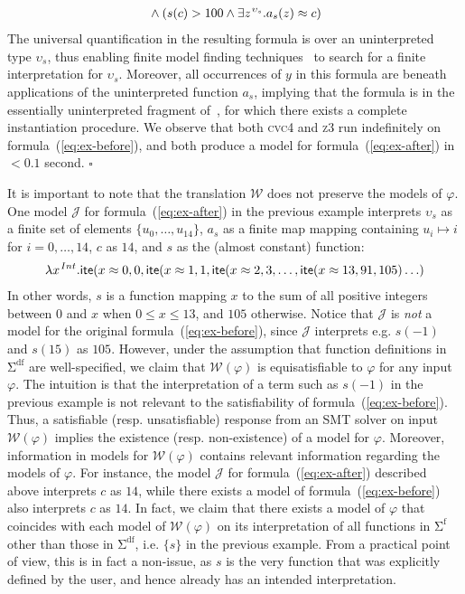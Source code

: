 \documentclass[runningheads,a4paper]{llncs}
\newcommand{\con}[1]{\mathsf{#1}}
\let\oldSigma=\Sigma
\def\Sigma{\mathrm{\oldSigma}}
\newcommand{\cvc}{\textsc{cvc}{\small 4}\xspace}
\newcommand{\ziii}{\textsc{z}{\small 3}\xspace}
\newcommand{\teq}{\approx}
\newcommand{\I}{\mathcal{J}} %
\newcommand{\conv}{\mathcal{W}}
\newcommand{\sfuns}[1]{#1^\mathrm{f}}
\newcommand{\sfundefs}[1]{#1^\mathrm{df}}
\newcommand{\lite}{\con{ite}}
\newcommand{\farg}[1]{a_{#1}}
\newcommand{\fargsort}[1]{\upsilon_{#1}}
\newcommand{\vthinspace}{\kern+0.083333em}
\newcommand{\typ}[1]{^{\vthinspace #1}}
\begin{document}
\begin{example}
\begin{eqnarray}
\begin{split}
\end{split}  
\wedge ( s( c ) > 100 \wedge \exists z\typ{\fargsort{s}}. \farg{s}( z ) \teq c )
\end{eqnarray} 
The universal quantification in the resulting formula is over an uninterpreted type $\fargsort{s}$, 
thus enabling finite model finding techniques~\cite{ReyEtAl-1-RR-13} to search for a finite interpretation for $\fargsort{s}$.
Moreover, all occurrences of $y$ in this formula are beneath applications of the uninterpreted function $\farg{s}$,
implying that the formula is in the essentially uninterpreted fragment of~\cite{GeDeM-CAV-09}, for which there exists a complete instantiation procedure.
We observe that both \cvc and \ziii run indefinitely on formula~(\ref{eq:ex-before}),
and both produce a model for formula~(\ref{eq:ex-after}) in $<0.1$ second.
$\square$
\end{example}

It is important to note that the translation $\conv$ does not preserve the models of $\varphi$.
One model $\I$ for formula~(\ref{eq:ex-after}) in the previous example interprets 
$\fargsort{s}$ as a finite set of elements $\{ u_0, \ldots, u_{14} \}$,
$\farg{s}$ as a finite map mapping containing $u_i \mapsto i$ for $i = 0, \ldots, 14$,
$c$ as $14$, 
and $s$ as the (almost constant) function:
\begin{eqnarray}
\lambda x\typ{Int}. \lite( x \teq 0, 0, \lite( x \teq 1, 1, \lite( x \teq 2, 3, \ldots, \lite( x \teq 13, 91, 105 ) \ldots )
\end{eqnarray}
In other words, $s$ is a function mapping $x$ to the sum of all positive integers between $0$ and $x$ when $0 \leq x \leq 13$,
and $105$ otherwise.
Notice that $\I$ is \emph{not} a model for the original formula~(\ref{eq:ex-before}),
since $\I$ interprets e.g. $s( -1 )$ and $s( 15 )$ as $105$.
However, under the assumption that function definitions in $\sfundefs{\Sigma}$ are well-specified, 
we claim that $\conv(\varphi)$ is equisatisfiable to $\varphi$ for any input $\varphi$.
The intuition is that the interpretation of a term such as $s( -1 )$ in the previous example is not relevant to the satisfiability of formula~(\ref{eq:ex-before}).
Thus, a satisfiable (resp. unsatisfiable) response from an SMT solver on input $\conv( \varphi )$ implies the existence (resp. non-existence) of a model for $\varphi$.
Moreover, information in models for $\conv( \varphi )$ contains relevant information regarding the models of $\varphi$.
For instance, the model $\I$ for formula~(\ref{eq:ex-after}) described above interprets $c$ as $14$, 
while there exists a model of formula~(\ref{eq:ex-before}) also interprets $c$ as $14$.
In fact, we claim that there exists a model of $\varphi$ that coincides with each model of $\conv( \varphi )$ on its interpretation of all functions in $\sfuns{\Sigma}$ 
other than those in $\sfundefs{\Sigma}$, i.e. $\{ s \}$ in the previous example.
From a practical point of view, this is in fact a non-issue, as $s$ is the very function that was explicitly defined by the user,
and hence already has an intended interpretation.
\end{document}
